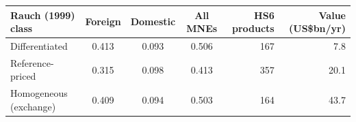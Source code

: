 \begin{tabular}{lcccrr}
\toprule
Rauch (1999) class & Foreign & Domestic & All MNEs & HS6 products & Value (US\$bn/yr) \\
\midrule
Differentiated & 0.413 & 0.093 & 0.506 & 167 & 7.8 \\
Reference-priced & 0.315 & 0.098 & 0.413 & 357 & 20.1 \\
Homogeneous (exchange) & 0.409 & 0.094 & 0.503 & 164 & 43.7 \\
\bottomrule
\end{tabular}
